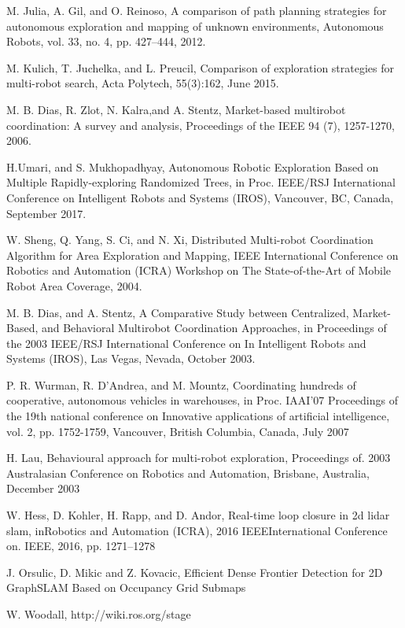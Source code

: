 \documentclass[letterpaper, 10 pt, conference]{ieeeconf}  %
\begin{document}
\begin{thebibliography}{99}
 M. Julia, A. Gil, and O. Reinoso, A comparison of path planning strategies for autonomous exploration and mapping of unknown environments, Autonomous Robots, vol. 33, no. 4, pp. 427–444, 2012. 

 M. Kulich, T. Juchelka, and L. Preucil, Comparison of exploration strategies for multi-robot search, Acta Polytech, 55(3):162, June 2015. 

 M. B. Dias, R. Zlot, N. Kalra,and A. Stentz, Market-based multirobot coordination: A survey and analysis, Proceedings of the IEEE 94 (7), 1257-1270, 2006.

 H.Umari, and S. Mukhopadhyay, Autonomous Robotic Exploration Based on Multiple Rapidly-exploring Randomized Trees,  in Proc. IEEE/RSJ International Conference on Intelligent Robots and Systems (IROS), Vancouver, BC, Canada, September 2017.
  
 W. Sheng, Q. Yang, S. Ci, and N. Xi, Distributed Multi-robot Coordination Algorithm for Area Exploration and Mapping, IEEE International Conference on Robotics and Automation (ICRA) Workshop on The State-of-the-Art of Mobile Robot Area Coverage, 2004.

 M. B. Dias, and A. Stentz, A Comparative Study between Centralized, Market-Based, and Behavioral Multirobot Coordination Approaches, in Proceedings of the 2003 IEEE/RSJ  International Conference on In Intelligent Robots and Systems (IROS), Las Vegas, Nevada, October 2003.

 P. R. Wurman, R. D'Andrea, and M. Mountz, Coordinating hundreds of cooperative, autonomous vehicles in warehouses, in Proc. IAAI'07 Proceedings of the 19th national conference on Innovative applications of artificial intelligence, vol. 2, pp. 1752-1759, Vancouver, British Columbia, Canada, July 2007
 
 H. Lau, Behavioural approach for multi-robot exploration, Proceedings of. 2003 Australasian Conference on Robotics and Automation, Brisbane, Australia, December 2003

 W.  Hess,  D.  Kohler,  H.  Rapp,  and  D.  Andor, Real-time  loop  closure in  2d  lidar  slam, inRobotics  and  Automation  (ICRA), 2016  IEEEInternational Conference on. IEEE, 2016, pp. 1271–1278

 J. Orsulic, D. Mikic and Z. Kovacic, Efficient Dense Frontier Detection for 2D GraphSLAM Based on Occupancy Grid Submaps

 W. Woodall, http://wiki.ros.org/stage

\end{thebibliography}
\end{document}
